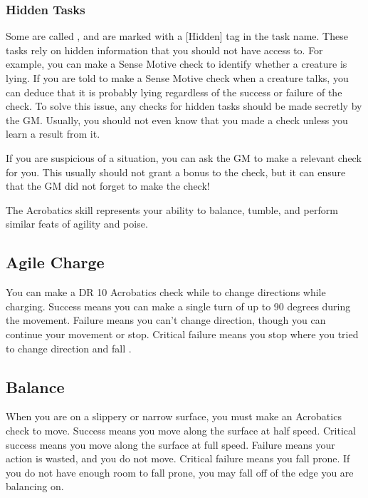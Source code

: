     \subsubsection{Hidden Tasks}\label{Hidden Tasks}
        Some  are called , and are marked with a [Hidden] tag in the task name.
        These tasks rely on hidden information that you should not have access to.
        For example, you can make a Sense Motive check to identify whether a creature is lying.
        If you are told to make a Sense Motive check when a creature talks, you can deduce that it is probably lying regardless of the success or failure of the check.
        To solve this issue, any checks for hidden tasks should be made secretly by the GM.\@
        Usually, you should not even know that you made a check unless you learn a result from it.

        If you are suspicious of a situation, you can ask the GM to make a relevant check for you.
        This usually should not grant a bonus to the check, but it can ensure that the GM did not forget to make the check!

\newpage
{}
        The Acrobatics skill represents your ability to balance, tumble, and perform similar feats of agility and poise.

    \subsection{Agile Charge}
        You can make a DR 10 Acrobatics check while  to change directions while charging.
        Success means you can make a single turn of up to 90 degrees during the movement.
        Failure means you can't change direction, though you can continue your movement or stop.
        Critical failure means you stop where you tried to change direction and fall \prone.

    \subsection{Balance}\label{Balance}

        When you are on a slippery or narrow surface, you must make an Acrobatics check to move.
        Success means you move along the surface at half speed.
        Critical success means you move along the surface at full speed.
        Failure means your action is wasted, and you do not move.
        Critical failure means you fall prone.
        If you do not have enough room to fall prone, you may fall off of the edge you are balancing on.

